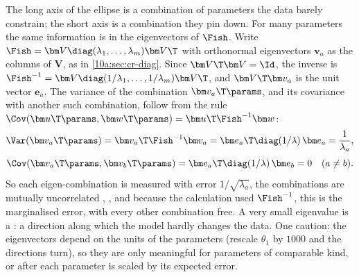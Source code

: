 The long axis of the ellipse is a combination of parameters the data barely constrain; the short axis is a
combination they pin down. For many parameters the same information is in the eigenvectors of $\Fish$. Write
$\Fish=\bm V\diag(\lambda_1,\dots,\lambda_m)\bm V\T$ with orthonormal eigenvectors $\bm v_a$ as the columns of $\bm V$, as in
\cref{10a:sec:cr-diag}. Since $\bm V\T\bm V=\Id$, the inverse is $\Fish^{-1}=\bm V\diag(1/\lambda_1,\dots,1/\lambda_m)\bm V\T$, and
$\bm V\T\bm v_a$ is the unit vector $\bm e_a$. The variance of the combination $\bm v_a\T\params$, and its covariance with
another such combination, follow from the rule $\Cov(\bm u\T\params,\bm w\T\params)=\bm u\T\Fish^{-1}\bm w$:
\[
  \Var(\bm v_a\T\params)=\bm v_a\T\Fish^{-1}\bm v_a=\bm e_a\T\diag(1/\lambda)\,\bm e_a=\frac1{\lambda_a},
\]
\[
  \Cov(\bm v_a\T\params,\bm v_b\T\params)=\bm e_a\T\diag(1/\lambda)\,\bm e_b=0\quad(a\neq b).
\]
So each eigen-combination is measured with error $1/\sqrt{\lambda_a}$, the combinations are mutually uncorrelated
, \cite{TTH1997}, and because the calculation used $\Fish^{-1}$, this is the
marginalised error, with every other combination free. A very small
eigenvalue is a : a direction along which the model hardly changes the data. One caution: the
eigenvectors depend on the units of the parameters (rescale $\theta_1$ by $1000$ and the directions turn), so
they are only meaningful for parameters of comparable kind, or after each parameter is scaled by its
expected error.

